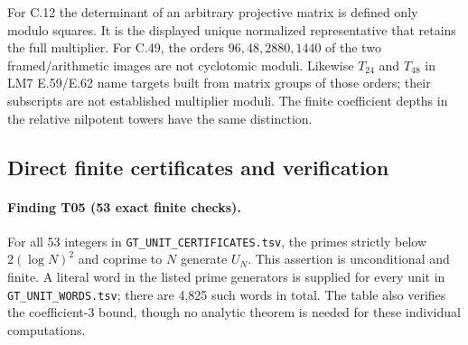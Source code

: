 \documentclass[11pt,a4paper]{article}
\begin{document}
For C.12 the determinant of an arbitrary projective matrix is defined
only modulo squares. It is the displayed unique normalized
representative that retains the full multiplier. For C.49, the orders
$96,48,2880,1440$ of the two framed/arithmetic images are not
cyclotomic moduli. Likewise $T_{24}$ and $T_{48}$ in LM7 E.59/E.62
name targets built from matrix groups of those orders; their subscripts
are not established multiplier moduli. The finite coefficient depths
in the relative nilpotent towers have the same distinction.

\subsection{Direct finite certificates and verification}

\paragraph{Finding T05 (53 exact finite checks).}
For all 53 integers in \texttt{GT\_UNIT\_CERTIFICATES.tsv}, the primes
strictly below $2(\log N)^2$ and coprime to $N$ generate $U_N$.
This assertion is unconditional and finite. A literal word in the
listed prime generators is supplied for every unit in
\texttt{GT\_UNIT\_WORDS.tsv}; there are 4,825 such words in total.
The table also verifies the coefficient-$3$ bound, though no analytic
theorem is needed for these individual computations.
\end{document}
